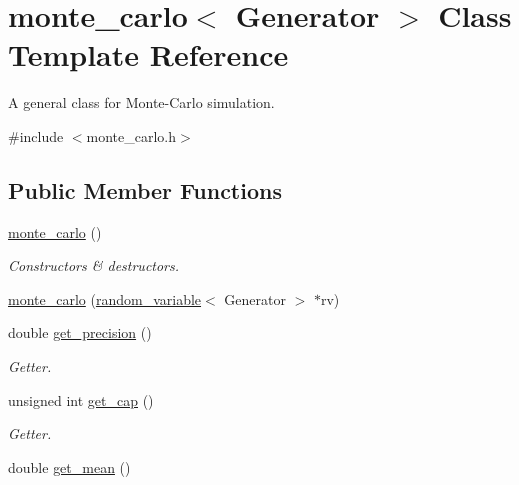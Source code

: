 \hypertarget{classmonte__carlo}{}\section{monte\+\_\+carlo$<$ Generator $>$ Class Template Reference}
\label{classmonte__carlo}


A general class for Monte-\/\+Carlo simulation.  




{\ttfamily \#include $<$monte\+\_\+carlo.\+h$>$}

\subsection*{Public Member Functions}
\begin{DoxyCompactItemize}
\item 
\hyperlink{classmonte__carlo_a602098d8c4cd2400e8b6036a7526437d}{monte\+\_\+carlo} ()
\begin{DoxyCompactList}\small\item\em Constructors \& destructors. \end{DoxyCompactList}\item 
\hyperlink{classmonte__carlo_a3c7619083f106006f7549bfa21af0b70}{monte\+\_\+carlo} (\hyperlink{classrandom__variable}{random\+\_\+variable}$<$ Generator $>$ $\ast$rv)
\item 
double \hyperlink{classmonte__carlo_ae8ba9ec39bb65da0a1d4c5881c3c57d9}{get\+\_\+precision} ()\hypertarget{classmonte__carlo_ae8ba9ec39bb65da0a1d4c5881c3c57d9}{}\label{classmonte__carlo_ae8ba9ec39bb65da0a1d4c5881c3c57d9}

\begin{DoxyCompactList}\small\item\em Getter. \end{DoxyCompactList}\item 
unsigned int \hyperlink{classmonte__carlo_af73122a99655bfdd93d5b72f32ea8ff1}{get\+\_\+cap} ()\hypertarget{classmonte__carlo_af73122a99655bfdd93d5b72f32ea8ff1}{}\label{classmonte__carlo_af73122a99655bfdd93d5b72f32ea8ff1}

\begin{DoxyCompactList}\small\item\em Getter. \end{DoxyCompactList}\item 
double \hyperlink{classmonte__carlo_af771b7b89e0ff85acfff8d6156a35cbf}{get\+\_\+mean} ()\hypertarget{classmonte__carlo_af771b7b89e0ff85acfff8d6156a35cbf}{}\label{classmonte__carlo_af771b7b89e0ff85acfff8d6156a35cbf}


\end{DoxyCompactItemize}
